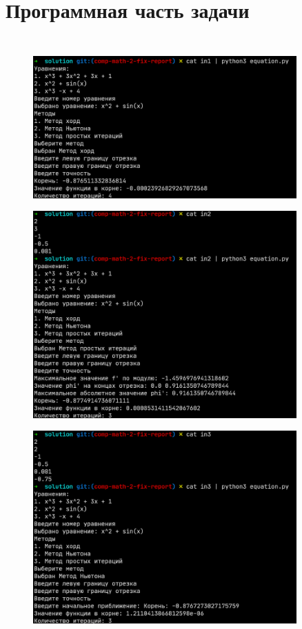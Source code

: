 \section{Программная часть задачи}
\inputminted[breaklines]{Python}{./solution/equation.py}
\inputminted[breaklines]{Python}{./solution/system.py}

\begin{figure}[H]
	\centering
	\includegraphics[width=0.9\textwidth]{./img/test1.png}
\end{figure}

\begin{figure}[H]
	\centering
	\includegraphics[width=0.9\textwidth]{./img/test2.png}
\end{figure}

\begin{figure}[H]
	\centering
	\includegraphics[width=0.9\textwidth]{./img/test3.png}
\end{figure}

